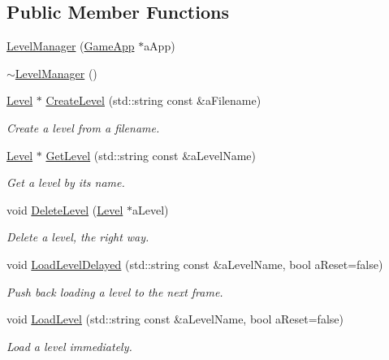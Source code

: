 \subsection*{Public Member Functions}
\begin{DoxyCompactItemize}
\item 
\hyperlink{classLevelManager_ad67dc90f18b26a9d379d4b3705fc0c1f}{Level\+Manager} (\hyperlink{classGameApp}{Game\+App} $\ast$a\+App)
\item 
\hyperlink{classLevelManager_a72ca9c27cc6b85143e20f83c520d1215}{$\sim$\+Level\+Manager} ()
\item 
\hyperlink{classLevel}{Level} $\ast$ \hyperlink{classLevelManager_ae236f997f3b98e08b6a2305677b25563}{Create\+Level} (std\+::string const \&a\+Filename)
\begin{DoxyCompactList}\small\item\em Create a level from a filename. \end{DoxyCompactList}\item 
\hyperlink{classLevel}{Level} $\ast$ \hyperlink{classLevelManager_a671a1a5313fa924864baeeb58bcd9351}{Get\+Level} (std\+::string const \&a\+Level\+Name)
\begin{DoxyCompactList}\small\item\em Get a level by its name. \end{DoxyCompactList}\item 
void \hyperlink{classLevelManager_a369449df47c27e3bd45e4ef8ecb253c6}{Delete\+Level} (\hyperlink{classLevel}{Level} $\ast$a\+Level)
\begin{DoxyCompactList}\small\item\em Delete a level, the right way. \end{DoxyCompactList}\item 
void \hyperlink{classLevelManager_a8de41542a17518b575c70875c2bed60e}{Load\+Level\+Delayed} (std\+::string const \&a\+Level\+Name, bool a\+Reset=false)
\begin{DoxyCompactList}\small\item\em Push back loading a level to the next frame. \end{DoxyCompactList}\item 
void \hyperlink{classLevelManager_a5493be95283eea28441ea91979fa4706}{Load\+Level} (std\+::string const \&a\+Level\+Name, bool a\+Reset=false)
\begin{DoxyCompactList}\small\item\em Load a level immediately. \end{DoxyCompactList}\item 

\end{DoxyCompactItemize}
